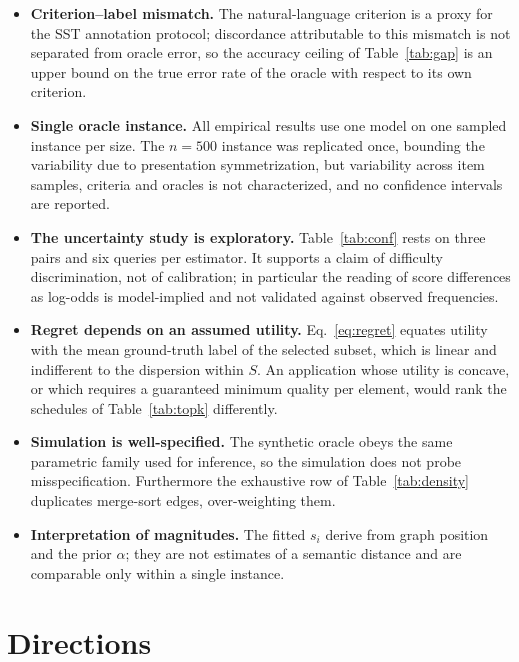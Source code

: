 \documentclass[11pt,a4paper]{article}
\begin{document}
\begin{itemize}
  \item \textbf{Criterion--label mismatch.} The natural-language criterion is a
    proxy for the SST annotation protocol; discordance attributable to this
    mismatch is not separated from oracle error, so the accuracy ceiling of
    Table~\ref{tab:gap} is an upper bound on the true error rate of the oracle
    with respect to its own criterion.
  \item \textbf{Single oracle instance.} All empirical results use one model on
    one sampled instance per size. The $n=500$ instance was replicated once,
    bounding the variability due to presentation symmetrization, but variability
    across item samples, criteria and oracles is not characterized, and no
    confidence intervals are reported.
  \item \textbf{The uncertainty study is exploratory.} Table~\ref{tab:conf}
    rests on three pairs and six queries per estimator. It supports a claim of
    difficulty discrimination, not of calibration; in particular the reading of
    score differences as log-odds is model-implied and not validated against
    observed frequencies.
  \item \textbf{Regret depends on an assumed utility.} Eq.~\eqref{eq:regret}
    equates utility with the mean ground-truth label of the selected subset,
    which is linear and indifferent to the dispersion within $S$. An application
    whose utility is concave, or which requires a guaranteed minimum quality per
    element, would rank the schedules of Table~\ref{tab:topk} differently.
  \item \textbf{Simulation is well-specified.} The synthetic oracle obeys the
    same parametric family used for inference, so the simulation does not probe
    misspecification. Furthermore the exhaustive row of Table~\ref{tab:density}
    duplicates merge-sort edges, over-weighting them.
  \item \textbf{Interpretation of magnitudes.} The fitted $s_i$ derive from
    graph position and the prior $\alpha$; they are not estimates of a semantic
    distance and are comparable only within a single instance.
\end{itemize}

\section{Directions}
\end{document}
